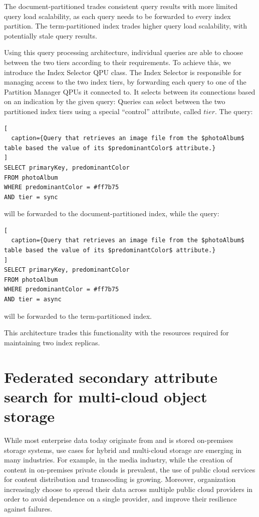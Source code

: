 The document-partitioned trades consistent query results with more limited query load scalability,
as each query needs to be forwarded to every index partition.
The term-partitioned index trades higher query load scalability, with potentially stale query results.

Using this query processing architecture, individual queries are able to choose between the two tiers
according to their requirements.
To achieve this, we introduce the Index Selector QPU class.
The Index Selector is responsible for managing access to the two index tiers,
by forwarding each query to one of the Partition Manager QPUs it connected to.
It selects between its connections based on an indication by the given query:
Queries can select between the two partitioned index tiers using a special ``control'' attribute, called $tier$.
The query:

\begin{lstlisting}[
  caption={Query that retrieves an image file from the $photoAlbum$ table based the value of its $predominantColor$ attribute.}
]
SELECT primaryKey, predominantColor
FROM photoAlbum
WHERE predominantColor = #ff7b75
AND tier = sync
\end{lstlisting}

\noindent
will be forwarded to the document-partitioned index, while the query:

\begin{lstlisting}[
  caption={Query that retrieves an image file from the $photoAlbum$ table based the value of its $predominantColor$ attribute.}
]
SELECT primaryKey, predominantColor
FROM photoAlbum
WHERE predominantColor = #ff7b75
AND tier = async
\end{lstlisting}

\noindent
will be forwarded to the term-partitioned index.

This architecture trades this functionality with the resources required for maintaining
two index replicas.



\section{Federated secondary attribute search for multi-cloud object storage}
\label{sec:zenko}

While most enterprise data today originate from and is stored on-premises storage systems,
use cases for hybrid and multi-cloud storage are emerging in many industries.
For example, in the media industry, while the creation of content in on-premises private clouds is prevalent,
the use of public cloud services for content distribution and transcoding \cite{scality:bloomberg} is growing.
Moreover, organization increasingly choose to spread their data across multiple public cloud providers in order to avoid
dependence on a single provider, and improve their resilience against failures.

